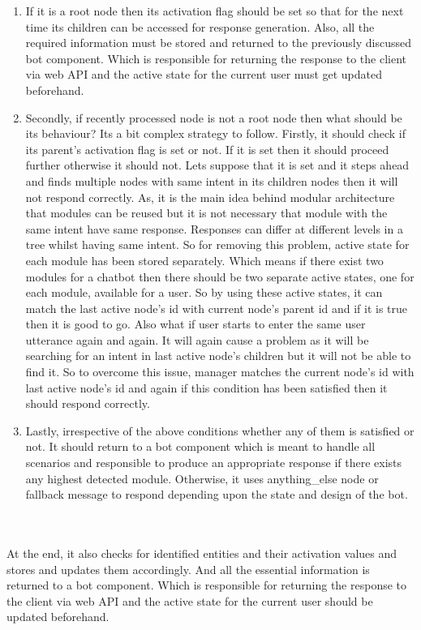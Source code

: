 \begin{enumerate}
    \item If it is a root node then its activation flag should be set so that for the next time its children can be accessed for response generation. Also, all the required information must be stored and returned to the previously discussed bot component. Which is responsible for returning the response to the client via web API and the active state for the current user must get updated beforehand. 
    \item Secondly, if recently processed node is not a root node then what should be its behaviour? Its a bit complex strategy to follow. Firstly, it should check if its parent's activation flag is set or not. If it is set then it should proceed further otherwise it should not. Lets suppose that it is set and it steps ahead and finds multiple nodes with same intent in its children nodes then it will not respond correctly. As, it is the main idea behind modular architecture that modules can be reused but it is not necessary that module with the same intent have same response. Responses can differ at different levels in a tree whilst having same intent. So for removing this problem, active state for each module has been stored separately. Which means if there exist two modules for a chatbot then there should be two separate active states, one for each module, available for a user. So by using these active states, it can match the last active node's id with current node's parent id and if it is true then it is good to go. Also what if user starts to enter the same user utterance again and again. It will again cause a problem as it will be searching for an intent in last active node's children but it will not be able to find it. So to overcome this issue, manager matches the current node's id with last active node's id and again if this condition has been satisfied then it should respond correctly. 
    \item Lastly, irrespective of the above conditions whether any of them is satisfied or not. It should return to a bot component which is meant to handle all scenarios and responsible to produce an appropriate response if there exists any highest detected module. Otherwise, it uses anything\_else node or fallback message to respond depending upon the state and design of the bot.
\end{enumerate} 
\\~\\
At the end, it also checks for identified entities and their activation values and stores and updates them accordingly. And all the essential information is returned to a bot component. Which is responsible for returning the response to the client via web API and the active state for the current user should be updated beforehand.


